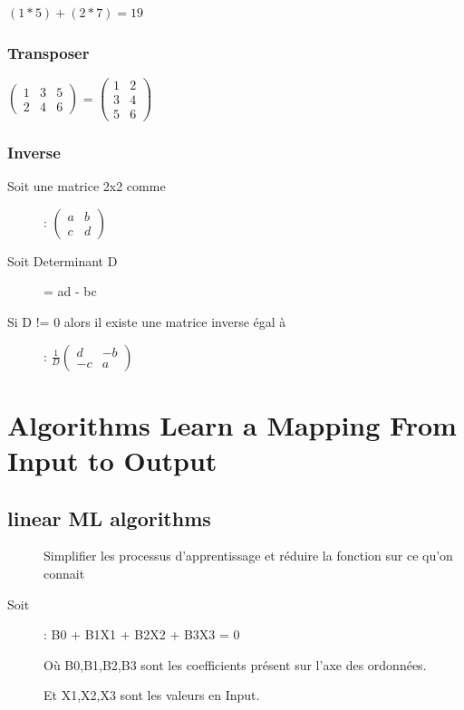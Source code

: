 $(1 * 5) + (2 * 7) = 19$

\subsubsection{Transposer}

$\left(\begin{array}{ccc}
1 & 3 & 5 \\ 2 & 4 & 6 \end{array} \right) $
= 
$\left(\begin{array}{cc}
1 & 2 \\ 3 & 4 \\ 5 & 6 \end{array} \right) $

\subsubsection{Inverse}
\begin{description}
\item[Soit une matrice 2x2 comme]:
$\left(\begin{array}{ccc}
a & b \\ c & d \end{array} \right) $
\item[Soit Determinant D] = ad - bc
\item[Si D != 0 alors il existe une matrice inverse égal à]:
$ \frac{1}{D} \left(\begin{array}{ccc}
d & -b \\ -c & a \end{array} \right) $
\end{description}

\section{Algorithms Learn a Mapping From Input to Output}
\subsection{linear ML algorithms}

\begin{description}
\item[] Simplifier les processus d'apprentissage et réduire la fonction sur ce qu'on connait
\item[Soit ]: B0 + B1X1 + B2X2 + B3X3 = 0
\item[] Où B0,B1,B2,B3 sont les coefficients présent sur l'axe des ordonnées.
\item[] Et X1,X2,X3 sont les valeurs en Input.
\end{description}

